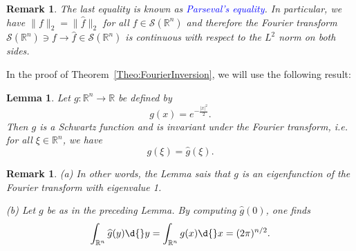 \documentclass[12pt, oneside, a4paper]{article}
\newtheorem{lem}[thm]{Lemma}
\theoremstyle{dfn}
\newtheorem{rem}[thm]{Remark}
\def \S {\ensuremath{\mathcal{S}}}
\def \S {\ensuremath{\mathcal{S}}}
\def\Rbb{\ensuremath{\mathbb{R}}}
\providecommand{\norm}[1]{\lVert#1\rVert}
\providecommand{\abs}[1]{\lvert#1\rvert}
\begin{document}
\begin{rem}
The last equality is known as \textcolor{blue}{Parseval's equality}. In particular, we have $\norm{f}_2 = \norm{\widehat{f}}_2$ for all $f \in \S(\Rbb^n)$ and therefore the Fourier transform $\S(\Rbb^n) \ni f \to \widehat{f} \in \S(\Rbb^n)$ is continuous with respect to the $L^2$ norm on both sides.
\end{rem}

In the proof of Theorem~\ref{Theo:FourierInversion}, we will use the following result:

\begin{lem}\label{lemma:GaussianInvariant}
Let $g \colon \Rbb^n \to \Rbb$ be defined by
\[
g(x) = e^{-\frac{\abs{x}^2}{2}}.
\]
Then $g$ is a Schwartz function and is invariant under the Fourier transform, i.e. for all $\xi \in \Rbb^n$, we have
\[
g(\xi) = \widehat{g}(\xi).
\]
\end{lem}

\begin{rem}
(a) In other words, the Lemma sais that $g$ is an eigenfunction of the Fourier transform with eigenvalue 1.

(b) Let $g$ be as in the preceding Lemma. By computing $\widehat{g}(0)$, one finds
\begin{equation}\label{remark:GaussianInvariant}
\int_{\Rbb^n } \widehat{g}(y) \d{}y
= \int_{\Rbb^n } g(x) \d{}x
= (2\pi)^{n/2}.
\end{equation}
\end{rem}
\end{document}
